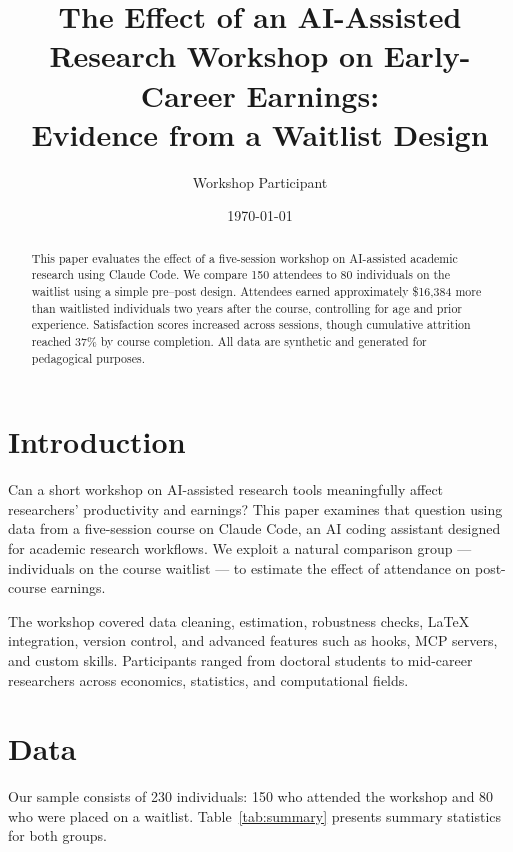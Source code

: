 \documentclass[12pt]{article}
\title{The Effect of an AI-Assisted Research Workshop on Early-Career Earnings:\\ Evidence from a Waitlist Design}
\author{Workshop Participant}
\date{\today}
\begin{document}
\maketitle

\begin{abstract}
This paper evaluates the effect of a five-session workshop on AI-assisted academic research using Claude Code. We compare 150 attendees to 80 individuals on the waitlist using a simple pre--post design. Attendees earned approximately \$16,384 more than waitlisted individuals two years after the course, controlling for age and prior experience. Satisfaction scores increased across sessions, though cumulative attrition reached 37\% by course completion. All data are synthetic and generated for pedagogical purposes.
\end{abstract}

\section{Introduction}

Can a short workshop on AI-assisted research tools meaningfully affect researchers' productivity and earnings? This paper examines that question using data from a five-session course on Claude Code, an AI coding assistant designed for academic research workflows. We exploit a natural comparison group --- individuals on the course waitlist --- to estimate the effect of attendance on post-course earnings.

The workshop covered data cleaning, estimation, robustness checks, \LaTeX{} integration, version control, and advanced features such as hooks, MCP servers, and custom skills. Participants ranged from doctoral students to mid-career researchers across economics, statistics, and computational fields.

\section{Data}

Our sample consists of 230 individuals: 150 who attended the workshop and 80 who were placed on a waitlist. Table~\ref{tab:summary} presents summary statistics for both groups.

\begin{table}[H]
\centering
\caption{Summary Statistics by Attendance Status}
\label{tab:summary}

\end{table}
\end{document}
